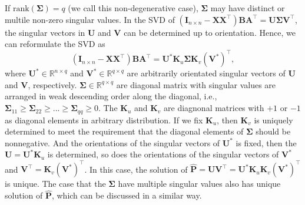 \documentclass[titlepage,11pt,twoside]{article}
\begin{document}
If $\text{rank}(\mathbf{\Sigma})=q$ (we call this non-degenerative case), $\mathbf{\Sigma}$ may have distinct or multile non-zero singular values. In the SVD of $(\mathbf{I}_{n\times n}-\mathbf{X}\mathbf{X}^{\top})\mathbf{B}\mathbf{A}^{\top}
=
\mathbf{U}\mathbf{\Sigma}\mathbf{V}^{\top}$, the singular vectors in $\mathbf{U}$ and $\mathbf{V}$
can be determined up to orientation. Hence, we can reformulate the SVD as 
\begin{equation}
(\mathbf{I}_{n\times n}-\mathbf{X}\mathbf{X}^{\top})\mathbf{B}\mathbf{A}^{\top}
=
\mathbf{U}^{*}\mathbf{K}_{u}\mathbf{\Sigma}\mathbf{K}_{v}(\mathbf{V}^{*})^{\top},
\end{equation}
where $\mathbf{U}^{*}\in \mathbb{R}^{n\times q}$ and $\mathbf{V}^{*}\in \mathbb{R}^{q\times q}$ are arbitrarily orientated singular vectors of $\mathbf{U}$ and $\mathbf{V}$, respectively. $\mathbf{\Sigma}\in \mathbb{R}^{q\times q}$ are diagonal matrix with singular values are arranged in weak descending order along the diagonal, i.e., $\mathbf{\Sigma}_{11}\ge\mathbf{\Sigma}_{22}\ge...\ge\mathbf{\Sigma}_{qq}\ge0$. The $\mathbf{K}_{u}$ and $\mathbf{K}_{v}$ are diagnonal matrices with $+1$ or $-1$ as diagonal elements in arbitrary distribution. If we fix $\mathbf{K}_{u}$, then $\mathbf{K}_{v}$ is uniquely determined to meet the requirement that the diagonal elements of $\mathbf{\Sigma}$ should be nonnegative. And the orientations of the singular vectors of $\mathbf{U}^{*}$ is fixed, then the $\mathbf{U}=\mathbf{U}^{*}\mathbf{K}_{u}$ is determined, so does the orientations of the singular vectors of $\mathbf{V}^{*}$ and $\mathbf{V}^{\top}=\mathbf{K}_{v}(\mathbf{V}^{*})^{\top}$. In this case, the solution of $\mathbf{\hat{P}}=\mathbf{U}\mathbf{V}^{\top}=\mathbf{U}^{*}\mathbf{K}_{u}\mathbf{K}_{v}(\mathbf{V}^{*})^{\top}$ is unique. The case that the $\mathbf{\Sigma}$ have multiple singular values also has unique solution of $\mathbf{\hat{P}}$, which can be discussed in a similar way. 
\end{document}
